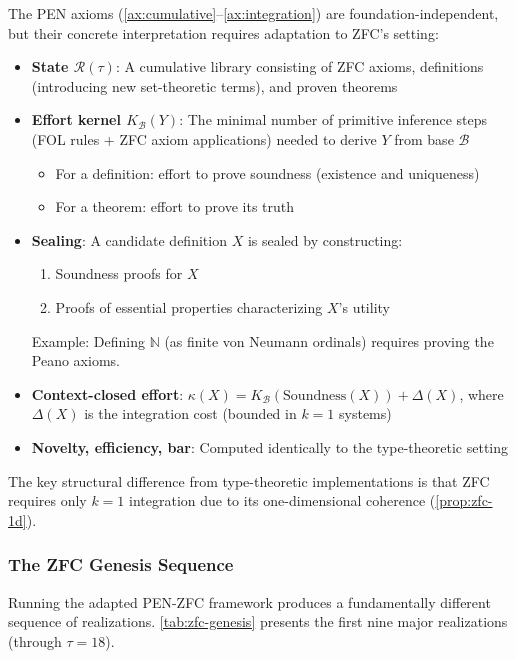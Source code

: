 \documentclass[11pt]{article}
\theoremstyle{definition}
\theoremstyle{remark}
\begin{document}
The PEN axioms (\cref{ax:cumulative}--\cref{ax:integration}) are foundation-independent, but their concrete interpretation requires adaptation to ZFC's setting:

\begin{itemize}
\item \textbf{State $\mathcal{R}(\tau)$}: A cumulative library consisting of ZFC axioms, definitions (introducing new set-theoretic terms), and proven theorems

\item \textbf{Effort kernel $K_{\mathcal{B}}(Y)$}: The minimal number of primitive inference steps (FOL rules + ZFC axiom applications) needed to derive $Y$ from base $\mathcal{B}$
\begin{itemize}
\item For a definition: effort to prove soundness (existence and uniqueness)
\item For a theorem: effort to prove its truth
\end{itemize}

\item \textbf{Sealing}: A candidate definition $X$ is sealed by constructing:
\begin{enumerate}
\item Soundness proofs for $X$
\item Proofs of essential properties characterizing $X$'s utility
\end{enumerate}
Example: Defining $\mathbb{N}$ (as finite von Neumann ordinals) requires proving the Peano axioms.

\item \textbf{Context-closed effort}: $\kappa(X) = K_{\mathcal{B}}(\text{Soundness}(X)) + \Delta(X)$, where $\Delta(X)$ is the integration cost (bounded in $k=1$ systems)

\item \textbf{Novelty, efficiency, bar}: Computed identically to the type-theoretic setting
\end{itemize}

The key structural difference from type-theoretic implementations is that ZFC requires only $k=1$ integration due to its one-dimensional coherence (\cref{prop:zfc-1d}).

\subsubsection{The ZFC Genesis Sequence}

Running the adapted PEN-ZFC framework produces a fundamentally different sequence of realizations. \cref{tab:zfc-genesis} presents the first nine major realizations (through $\tau = 18$).
\end{document}
